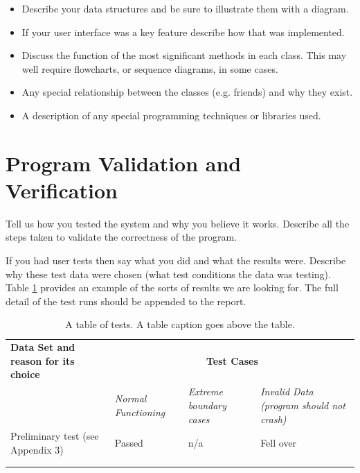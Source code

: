 \documentclass[11pt,a4paper]{article}
\begin{document}
\begin{itemize}
\item Describe your data structures and be sure to illustrate them
  with a diagram.

\item If your user interface was a key feature describe how that was
  implemented.

\item Discuss the function of the most significant methods in each
  class. This may well require flowcharts, or sequence diagrams, in
  some cases.

\item Any special relationship between the classes (e.g. friends) and
  why they exist.

\item A description of any special programming techniques or libraries
  used.
\end{itemize}

\section{Program Validation and Verification}
\label{ss:progr-valid-verif}

Tell us how you tested the system and why you believe it works.
Describe all the steps taken to validate the correctness of the
program.

If you had user tests then say what you did and what the results
were. Describe why these test data were chosen (what test conditions
the data was testing).  Table \ref{tab:tests} provides an example of
the sorts of results we are looking for. The full detail of the test
runs should be appended to the report.

\begin{table}[h!]
  \centering
\caption{A table of tests. A table caption goes above the table.}

  \begin{tabular}[t]{|p{5cm}|p{3cm}|p{3cm}|p{3cm}|} \hline \textbf{Data Set
    and reason for its choice} & \multicolumn{3}{c|}{\textbf{Test Cases}}\\
    \cline{2-4} & \emph{Normal Functioning} & \emph{Extreme boundary cases} &
    \emph{Invalid Data (program should not crash)} \\ \hline Preliminary test
    (see Appendix 3) & Passed & n/a & Fell over \\\hline &&&\\ \hline
    &&&\\ \hline
  \end{tabular}

\label{tab:tests}
\end{table}
\end{document}
